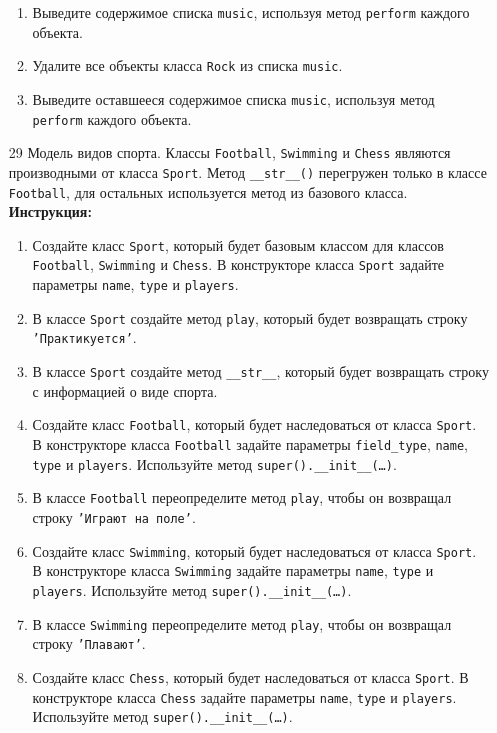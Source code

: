 \begin{enumerate}
\begin{enumerate}
    \item Выведите содержимое списка \texttt{music}, используя метод \texttt{perform} каждого объекта.
    \item Удалите все объекты класса \texttt{Rock} из списка \texttt{music}.
    \item Выведите оставшееся содержимое списка \texttt{music}, используя метод \texttt{perform} каждого объекта.
\end{enumerate}
\item[29]
Модель видов спорта. Классы \texttt{Football}, \texttt{Swimming} и \texttt{Chess} являются производными от класса \texttt{Sport}. Метод \texttt{\_\_str\_\_()} перегружен только в классе \texttt{Football}, для остальных используется метод из базового класса.
\textbf{Инструкция:}
\begin{enumerate}
    \item Создайте класс \texttt{Sport}, который будет базовым классом для классов \texttt{Football}, \texttt{Swimming} и \texttt{Chess}. В конструкторе класса \texttt{Sport} задайте параметры \texttt{name}, \texttt{type} и \texttt{players}.
    \item В классе \texttt{Sport} создайте метод \texttt{play}, который будет возвращать строку \texttt{'Практикуется'}.
    \item В классе \texttt{Sport} создайте метод \texttt{\_\_str\_\_}, который будет возвращать строку с информацией о виде спорта.
    \item Создайте класс \texttt{Football}, который будет наследоваться от класса \texttt{Sport}. В конструкторе класса \texttt{Football} задайте параметры \texttt{field\_type}, \texttt{name}, \texttt{type} и \texttt{players}. Используйте метод \texttt{super().\_\_init\_\_(\ldots)}.
    \item В классе \texttt{Football} переопределите метод \texttt{play}, чтобы он возвращал строку \texttt{'Играют на поле'}.
    \item Создайте класс \texttt{Swimming}, который будет наследоваться от класса \texttt{Sport}. В конструкторе класса \texttt{Swimming} задайте параметры \texttt{name}, \texttt{type} и \texttt{players}. Используйте метод \texttt{super().\_\_init\_\_(\ldots)}.
    \item В классе \texttt{Swimming} переопределите метод \texttt{play}, чтобы он возвращал строку \texttt{'Плавают'}.
    \item Создайте класс \texttt{Chess}, который будет наследоваться от класса \texttt{Sport}. В конструкторе класса \texttt{Chess} задайте параметры \texttt{name}, \texttt{type} и \texttt{players}. Используйте метод \texttt{super().\_\_init\_\_(\ldots)}.

\end{enumerate}
\end{enumerate}
